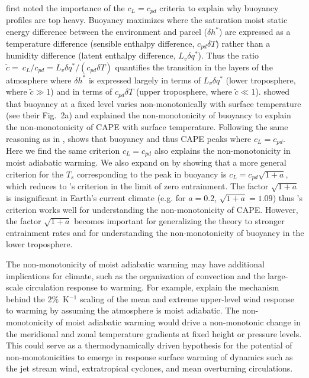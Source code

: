 \documentclass[draft]{ametsocV6.1}
\begin{document}
\cite{seeley2016} first noted the importance of the $c_L=c_{pd}$ criteria to explain why buoyancy profiles are top heavy. Buoyancy maximizes where the saturation moist static energy difference between the environment and parcel ($\delta h^*$) are expressed as a temperature difference (sensible enthalpy difference, $c_{pd}\delta T$) rather than a humidity difference (latent enthalpy difference, $L_v\delta q^*$). Thus the ratio $\tilde{c}= \ c_L / c_{pd} = L_v \delta q^* / (c_{pd} \delta T)$ quantifies the transition in the layers of the atmosphere where $\delta h^*$ is expressed largely in terms of $L_v \delta q^*$ (lower troposphere, where $\tilde{c}\gg1$) and in terms of $c_{pd}\delta T$ (upper troposphere, where $\tilde{c}\ll1$). \cite{seeley2015a} showed that buoyancy at a fixed level varies non-monotonically with surface temperature (see their Fig.~2a) and \cite{romps2016} explained the non-monotonicity of buoyancy to explain the non-monotonicity of CAPE with surface temperature. Following the same reasoning as in \cite{seeley2016}, \cite{romps2016} shows that buoyancy and thus CAPE peaks where $c_L = c_{pd}$. Here we find the same criterion $c_L = c_{pd}$ also explains the non-monotonicity in moist adiabatic warming. We also expand on \cite{romps2016} by showing that a more general criterion for the $T_s$ corresponding to the peak in buoyancy is $c_L = c_{pd}\sqrt{1+a}$, which reduces to \cite{romps2016}'s criterion in the limit of zero entrainment. The factor $\sqrt{1+a}$ is insignificant in Earth's current climate (e.g. for $a=0.2$, $\sqrt{1+a}=1.09$) thus \cite{romps2016}'s criterion works well for understanding the non-monotonicity of CAPE. However, the factor $\sqrt{1+a}$ becomes important for generalizing the theory to stronger entrainment rates and for understanding the non-monotonicity of buoyancy in the lower troposphere.

The non-monotonicity of moist adiabatic warming may have additional implications for climate, such as the organization of convection and the large-scale circulation response to warming. For example, \cite{shaw2025}  explain the mechanism behind the $2\%$~K$^{-1}$ scaling of the mean and extreme upper-level wind response to warming by assuming the atmosphere is moist adiabatic. The non-monotonicity of moist adiabatic warming would drive a non-monotonic change in the meridional and zonal temperature gradients at fixed height or pressure levels. This could serve as a thermodynamically driven hypothesis for the potential of non-monotonicities to emerge in response surface warming of dynamics such as the jet stream wind, extratropical cyclones, and mean overturning circulations.
\end{document}
